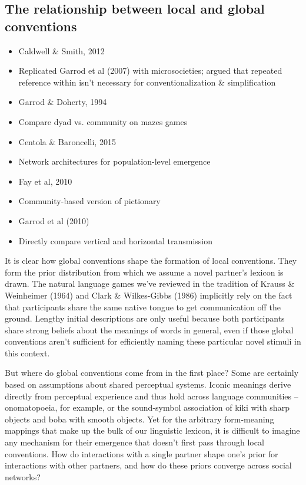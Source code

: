 \documentclass[11pt, floatsintext, man]{apa6}
\begin{document}

\subsection{The relationship between local and global conventions}

\begin{itemize}
\item Caldwell \& Smith, 2012
\item Replicated Garrod et al (2007) with microsocieties; argued that repeated reference within isn't necessary for conventionalization \& simplification
\item Garrod \& Doherty, 1994
\item Compare dyad vs. community on mazes games
\item Centola \& Baroncelli, 2015
\item Network architectures for population-level emergence
\item Fay et al, 2010 
\item Community-based version of pictionary
\item Garrod et al (2010)
\item Directly compare vertical and horizontal transmission
\end{itemize}

It is clear how global conventions shape the formation of local conventions. They form the prior distribution from which we assume a novel partner's lexicon is drawn. The natural language games we've reviewed in the tradition of Krauss \& Weinheimer (1964) and Clark \& Wilkes-Gibbs (1986) implicitly rely on the fact that participants share the same native tongue to get communication off the ground. Lengthy initial descriptions are only useful because both participants share strong beliefs about the meanings of words in general, even if those global conventions aren't sufficient for efficiently naming these particular novel stimuli in this context. 

But where do global conventions come from in the first place? Some are certainly based on assumptions about shared perceptual systems. Iconic meanings derive directly from perceptual experience and thus hold across language communities -- onomatopoeia, for example, or the sound-symbol association of kiki with sharp objects and boba with smooth objects. Yet for the arbitrary form-meaning mappings that make up the bulk of our linguistic lexicon, it is difficult to imagine any mechanism for their emergence that doesn't first pass through local conventions. How do interactions with a single partner shape one's prior for interactions with other partners, and how do these priors converge across social networks? 
\end{document}
